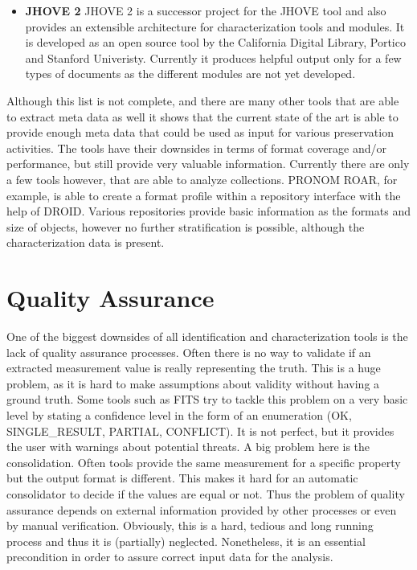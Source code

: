 \begin{itemize}
\item \textbf{JHOVE 2}\newline
JHOVE 2 is a successor project for the JHOVE tool and also provides an extensible architecture for characterization tools and modules. It is developed as an open source tool by the California Digital Library, Portico and Stanford Univeristy. Currently it produces helpful output only for a few types of documents as the different modules are not yet developed.

\end{itemize}

Although this list is not complete, and there are many other tools that are able to extract meta data as well it shows that the current state of the art is able to provide enough meta data that could be used as input for various preservation activities. The tools have their downsides in terms of format coverage and/or performance, but still provide very valuable information.
Currently there are only a few tools however, that are able to analyze collections. PRONOM ROAR, for example, is able to create a format profile within a repository interface with the help of DROID.
Various repositories provide basic information as the formats and size of objects, however no further stratification is possible, although the characterization data is present.



\section{Quality Assurance}
One of the biggest downsides of all identification and characterization tools is the lack of quality assurance processes. Often there is no way to validate if an extracted measurement value is really representing the truth. This is a huge problem, as it is hard to make assumptions about validity without having a ground truth.
Some tools such as FITS try to tackle this problem on a very basic level by stating a confidence level in the form of an enumeration (OK, SINGLE\_RESULT, PARTIAL, CONFLICT). It is not perfect, but it provides the user with warnings about potential threats.
A big problem here is the consolidation. Often tools provide the same measurement for a specific property but the output format is different. This makes it hard for an automatic consolidator to decide if the values are equal or not. Thus the problem of quality assurance depends on external information provided by other processes or even by manual verification. 
Obviously, this is a hard, tedious and long running process and thus it is (partially) neglected.
Nonetheless, it is an essential precondition in order to assure correct input data for the analysis.

